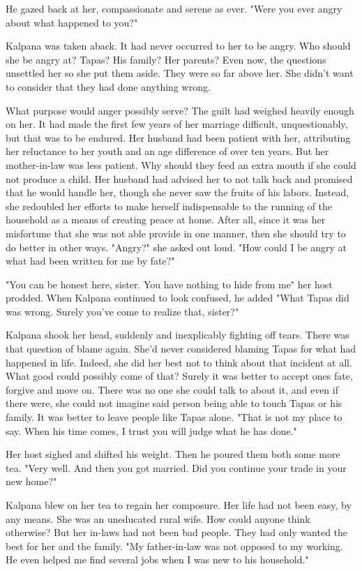 \documentclass{amsart}
\begin{document}
	He gazed back at her, compassionate and serene as ever. "Were you ever angry
	about what happened to you?"
	
	Kalpana was taken aback. It had never occurred to her to be angry. Who should she
	be angry at? Tapas? His family? Her parents? Even now, the questions unsettled her
	so she put them aside. They were so far above her. She didn't want to consider that 
	they had done anything wrong. 
	
	What purpose would anger possibly serve? The guilt had weighed heavily enough on her.
	It had made the first few years of her marriage difficult, unquestionably, but that was
	to be endured. Her husband had been patient with her, attributing her reluctance
	to her youth and an age difference of over ten years. But her mother-in-law was
	less patient. Why should they feed an extra mouth if she could not produce a
	child. Her husband had advised her to not talk back and promised that he would
	handle her, though she never saw the fruits of his labors. Instead, she
	redoubled her efforts to make herself indispensable to the running of the
	household as a means of creating peace at home. After all, since it was her
	misfortune that she was not able provide in one manner, then she should try to
	do better in other ways. "Angry?" she asked out loud. "How could I be angry at
	what had been written for me by fate?"
	
	"You can be honest here, sister. You have nothing to hide from me" her host prodded.
	When Kalpana continued to look confused, he added "What Tapas did was wrong.
	Surely you've come to realize that, sister?" 
	
	Kalpana shook her head, suddenly and inexplicably fighting off tears. There was that
	question of blame again. She'd never considered blaming
	Tapas for what had happened in life. Indeed, she did her best not to
	think about that incident at all. What good could possibly come of that? Surely it was
	better to accept ones fate, forgive and move on. There
	was no one she could talk to about it, and even if there were, she could not
	imagine said person being able to touch Tapas or his family. It was better to
	leave people like Tapas alone. "That is not my place to say. When his time
	comes, I trust you will judge what he has done."
	
	Her host sighed and shifted his weight. Then he poured them both some more tea.
	"Very well. And then you got married. Did you continue your trade in your new
	home?"
	
	Kalpana blew on her tea to regain her composure. Her life had not been easy, by
	any means. She was an uneducated rural wife. How could anyone think otherwise?
	But her in-laws had not been bad people. They had only wanted the best for her
	and the family. "My father-in-law was not opposed to my working. He even helped
	me find several jobs when I was new to his household."
	
\end{document}
